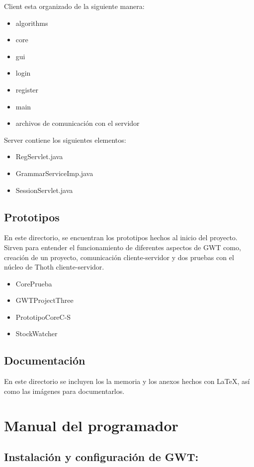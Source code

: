 Client esta organizado de la siguiente manera:

\begin{itemize}
	\item algorithms
	\item core
	\item gui
	\item login
	\item register
	\item main
	\item archivos de comunicación con el servidor
\end{itemize}	

Server contiene los siguientes elementos:
\begin{itemize}
	\item RegServlet.java
	\item GrammarServiceImp.java
	\item SessionServlet.java
\end{itemize}
\subsection{Prototipos}

En este directorio, se encuentran los prototipos hechos al inicio del proyecto. Sirven para entender el funcionamiento de diferentes aspectos de GWT como, creación de un proyecto, comunicación cliente-servidor y dos pruebas con el núcleo de Thoth cliente-servidor.

\begin{itemize}
	\item CorePrueba
	\item GWTProjectThree
	\item PrototipoCoreC-S
	\item StockWatcher
\end{itemize}	

\subsection{Documentación}

En este directorio se incluyen los la memoria y los anexos hechos con \LaTeX{}, así como las imágenes para documentarlos.

\section{Manual del programador}

\subsection{Instalación y configuración de GWT:}


